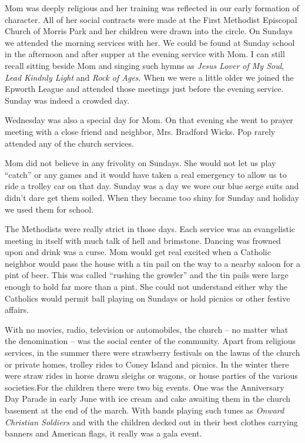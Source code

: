 \documentclass[12pt]{book}              %
\begin{document}
Mom was deeply religious and her training was reflected in our early formation of character. All of her social contracts were made at the First Methodist Episcopal Church of Morris Park and her children were drawn into the circle. On Sundays we attended the morning services with her. We could be found at Sunday school in the afternoon and after supper at the evening service with Mom. I can still recall sitting beside Mom and singing such hymns as {\it Jesus Lover of My Soul}, {\it Lead Kindnly Light} and {\it Rock of Ages}. When we were a little older we joined the Epworth League and attended those meetings just before the evening service. Sunday was indeed a crowded day. 

Wednesday was also a special day for Mom. On that evening she went to prayer meeting with a close friend and neighbor, Mrs. Bradford Wicks. Pop rarely attended any of the church services. 

Mom did not believe in any frivolity on Sundays. She would not let us play ``catch'' or any games and it would have taken a real emergency to allow us to ride a trolley car on that day. Sunday was a day we wore our blue serge suits and didn't dare get them soiled. When they became too shiny for Sunday and holiday we used them for school. 

The Methodists were really strict in those days. Each service was an evangelistic meeting in itself with much talk of hell and brimstone. Dancing was frowned upon and drink was a curse. Mom would get real excited when a Catholic neighbor would pass the house with a tin pail on the way to a nearby saloon for a pint of beer. This was called ``rushing the growler'' and the tin pails were large enough to hold far more than a pint. She could not understand either why the Catholics would permit ball playing on Sundays or hold picnics or other festive affairs. 

With no movies, radio, television or automobiles, the church -- no matter what the denomination -- was the social center of the community. Apart from religious services, in the summer there were strawberry festivals on the lawns of the church or private homes, trolley rides to Coney Island and picnics. In the winter there were straw rides in horse drawn sleighs or wagons, or house parties of the various societies.For the children there were two big events. One was the Anniversary Day Parade in early June with ice cream and cake awaiting them in the church basement at the end of the march. With bands playing such tunes as {\it Onward Christian Soldiers} and with the children decked out in their best clothes carrying banners and American flags, it really was a gala event. 
\end{document}

